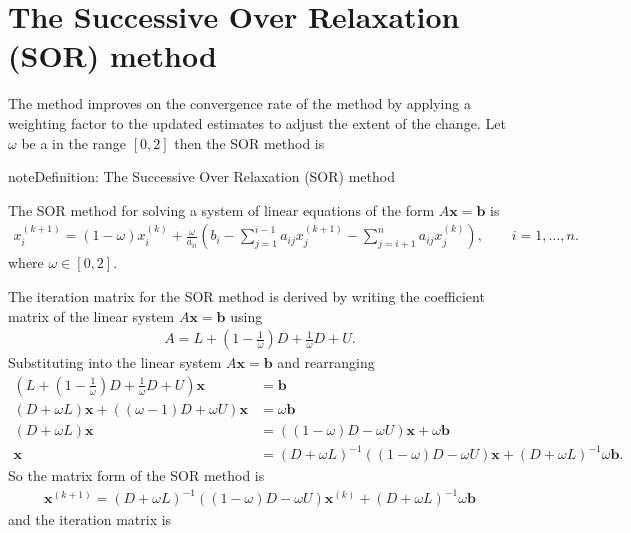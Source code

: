 \documentclass[letterpaper,10pt,english]{jupyterBook}
\begin{document}
\sphinxstepscope


\section{The Successive Over Relaxation (SOR) method}
\label{\detokenize{7_Indirect_methods/7.4_SOR_method:the-successive-over-relaxation-sor-method}}\label{\detokenize{7_Indirect_methods/7.4_SOR_method:sor-method-section}}\label{\detokenize{7_Indirect_methods/7.4_SOR_method::doc}}
\sphinxAtStartPar
The  method improves on the convergence rate of the {\hyperref[\detokenize{7_Indirect_methods/7.2_Gauss_Seidel_method:gauss-seidel-method-definition}]{}} method by applying a weighting factor to the updated estimates to adjust the extent of the change. Let \(\omega\) be a  in the range \([0,2]\) then the SOR method is

\begin{sphinxadmonition}{note}{Definition: The Successive Over Relaxation (SOR) method}

\sphinxAtStartPar
The SOR method for solving a system of linear equations of the form \(A \mathbf{x} = \mathbf{b}\) is
\begin{equation}\label{equation:7_Indirect_methods/7.4_SOR_method:sor-method-equation}
\begin{split}x_i^{(k+1)} =(1 - \omega) x_i^{(k)} + \frac{\omega}{a_{ii} }\left(b_i - \sum_{j=1}^{i-1} a_{ij} x_j^{(k+1)} -\sum_{j=i+1}^n a_{ij} x_j^{(k)} \right), \qquad i = 1, \ldots, n.\end{split}
\end{equation}
\sphinxAtStartPar
where \(\omega \in [0, 2]\).
\end{sphinxadmonition}

\sphinxAtStartPar
The iteration matrix for the SOR method is derived by writing the coefficient matrix of the linear system \(A\mathbf{x}=\mathbf{b}\) using
\begin{align*}
    A = L+\left(1-\frac{1}{\omega }\right)D+\frac{1}{\omega }D+U.
\end{align*}
\sphinxAtStartPar
Substituting into the linear system \(A \mathbf{x} = \mathbf{b}\) and rearranging
\begin{align*}
    \left(L+\left(1-\frac{1}{\omega }\right)D+\frac{1}{\omega }D+U\right)\mathbf{x}&=\mathbf{b}\\
    (D+\omega L)\mathbf{x}+((\omega -1)D+\omega U)\mathbf{x}&=\omega \mathbf{b}\\
    (D+\omega L)\mathbf{x}&=((1-\omega )D-\omega U)\mathbf{x}+\omega \mathbf{b}\\
    \mathbf{x}&=(D+\omega L)^{-1} ((1-\omega )D-\omega U)\mathbf{x}+(D+\omega L)^{-1} \omega \mathbf{b}.
\end{align*}
\sphinxAtStartPar
So the matrix form of the SOR method is
\begin{align*}
    \mathbf{x}^{(k+1)} =(D+\omega L)^{-1} ((1-\omega )D-\omega U)\mathbf{x}^{(k)} +(D+\omega L)^{-1} \omega \mathbf{b}
\end{align*}
\sphinxAtStartPar
and the iteration matrix is
\end{document}
